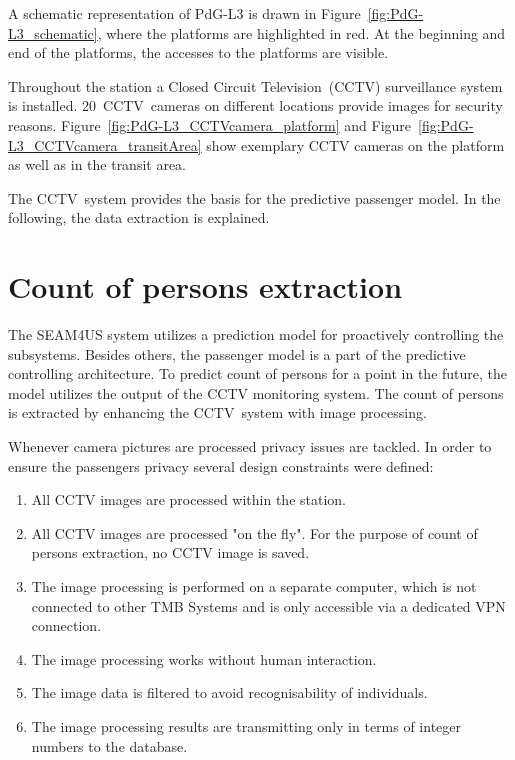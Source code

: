 A schematic representation of PdG-L3 is drawn in Figure~\ref{fig:PdG-L3_schematic}, where the platforms are highlighted in red. At the beginning and end of the platforms, the accesses to the platforms are visible.




Throughout the station a Closed Circuit Television~(CCTV) surveillance system is installed. 
20~CCTV~cameras on different locations provide images for security reasons. 
Figure~\ref{fig:PdG-L3_CCTVcamera_platform} and Figure~\ref{fig:PdG-L3_CCTVcamera_transitArea} show exemplary CCTV cameras on the platform as well as in the transit area.

The CCTV~system provides the basis for the predictive passenger model. In the following, the data extraction is explained.


\section{Count of persons extraction}
\label{sec:PassengerDensityDataExtraction}

The SEAM4US system utilizes a prediction model for proactively controlling the subsystems.
Besides others, the passenger model is a part of the predictive controlling architecture.
To predict count of persons for a point in the future, the model utilizes the output of the CCTV monitoring system. 
The count of persons is extracted by enhancing the CCTV~system with image processing.

Whenever camera pictures are processed privacy issues are tackled. In order to ensure the passengers privacy several design constraints were defined:

\begin{enumerate}\setlength{\itemsep}{-2pt}
  \item All CCTV images are processed within the station.
  \item All CCTV images are processed "on the fly". For the purpose of count of persons extraction, no CCTV image is saved.
  \item The image processing is performed on a separate computer, which is not connected to other TMB Systems and is only accessible via a dedicated VPN connection.
  \item The image processing works without human interaction.
  \item The image data is filtered to avoid recognisability of individuals.
  \item The image processing results are transmitting only in terms of integer numbers to the database.
\end{enumerate}

